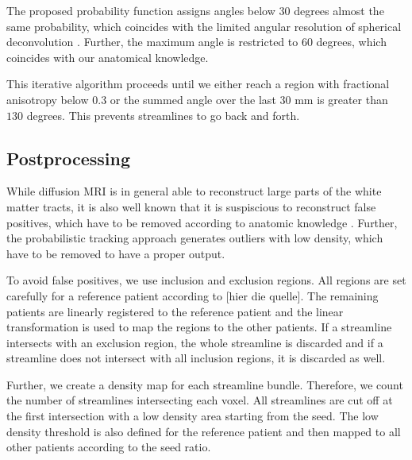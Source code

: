 The proposed probability function assigns angles below 30 degrees almost the
same probability, which coincides with the limited angular resolution of
spherical deconvolution \cite{TOURNIER20071459}. Further, the maximum angle is
restricted to 60 degrees, which coincides with our anatomical knowledge.

This iterative algorithm proceeds until we either reach a region with fractional
anisotropy below $0.3$ or the summed angle over the last $30$ mm is greater than
$130$ degrees. This prevents streamlines to go back and forth. 

\subsection{Postprocessing}
While diffusion MRI is in general able to reconstruct large parts of the white
matter tracts, it is also well known that it is suspiscious to reconstruct false
positives, which have to be removed according to anatomic knowledge
\cite{Wakana:2007, MaierHein:2017}. Further, the probabilistic tracking approach
generates outliers with low density, which have to be removed to have a proper
output. 

To avoid false positives, we use inclusion and exclusion regions. All regions
are set carefully for a reference patient according to [hier die quelle].
The remaining patients are linearly registered to the reference patient and the
linear transformation is used to map the regions to the other patients. 
If a streamline intersects with an exclusion region, the whole streamline is
discarded and if a streamline does not intersect with all inclusion regions, it
is discarded as well. 

Further, we create a density map for each streamline
bundle. Therefore, we count the number of streamlines intersecting each voxel.
All streamlines are cut off at the first intersection with a low density
area starting from the seed. The low density threshold is also defined for the
reference patient and then mapped to all other patients according to the seed
ratio.
